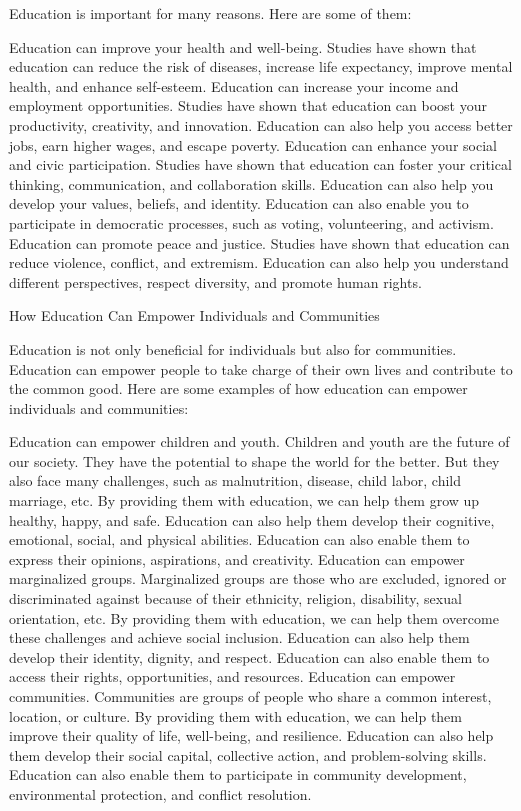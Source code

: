 \documentclass[a4paper,11pt]{article}
\begin{document}
Education is important for many reasons. Here are some of them:

Education can improve your health and well-being. Studies have shown that education can reduce the risk of diseases, increase life expectancy, improve mental health, and enhance self-esteem.
Education can increase your income and employment opportunities. Studies have shown that education can boost your productivity, creativity, and innovation. Education can also help you access better jobs, earn higher wages, and escape poverty.
Education can enhance your social and civic participation. Studies have shown that education can foster your critical thinking, communication, and collaboration skills. Education can also help you develop your values, beliefs, and identity. Education can also enable you to participate in democratic processes, such as voting, volunteering, and activism.
Education can promote peace and justice. Studies have shown that education can reduce violence, conflict, and extremism. Education can also help you understand different perspectives, respect diversity, and promote human rights.

How Education Can Empower Individuals and Communities

Education is not only beneficial for individuals but also for communities. Education can empower people to take charge of their own lives and contribute to the common good. Here are some examples of how education can empower individuals and communities:

Education can empower children and youth. Children and youth are the future of our society. They have the potential to shape the world for the better. But they also face many challenges, such as malnutrition, disease, child labor, child marriage, etc. By providing them with education, we can help them grow up healthy, happy, and safe. Education can also help them develop their cognitive, emotional, social, and physical abilities. Education can also enable them to express their opinions, aspirations, and creativity.
Education can empower marginalized groups. Marginalized groups are those who are excluded, ignored or discriminated against because of their ethnicity, religion, disability, sexual orientation, etc. By providing them with education, we can help them overcome these challenges and achieve social inclusion. Education can also help them develop their identity, dignity, and respect. Education can also enable them to access their rights, opportunities, and resources.
Education can empower communities. Communities are groups of people who share a common interest, location, or culture. By providing them with education, we can help them improve their quality of life, well-being, and resilience. Education can also help them develop their social capital, collective action, and problem-solving skills. Education can also enable them to participate in community development, environmental protection, and conflict resolution.
\end{document}

